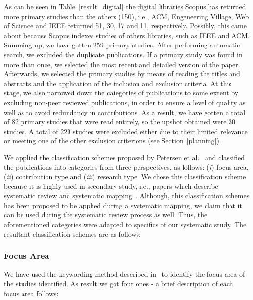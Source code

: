As can be seen in Table~\ref{result_digital} the digital libraries Scopus has returned more primary studies than the others (150), i.e., ACM, Engeneering Village, Web of Science and IEEE returned 51, 30, 17 and 11, respectively. Possibly, this came about because Scopus indexes studies of others libraries, such as IEEE and ACM. Summing up, we have gotten 259 primary studies. After performing automatic search, we excluded the duplicate publications. If a primary study was found in more than once, we selected the most recent and detailed version of the paper. Afterwards, we selected the primary studies by means of reading the titles and abstracts and the application of the inclusion and exclusion criteria. At this stage, we also narrowed down the categories of publications to some extent by excluding non-peer reviewed publications, in order to ensure a level of quality as well as to avoid redundancy in contributions. As a result, we have gotten a total of 82 primary studies that were read entirely, so the upshot obtained were 30 studies. A total of 229 studies were excluded either due to their limited relevance or meeting one of the other exclusion criterions (see Section~\ref{planning}).

We applied the classification schemes proposed by Petersen et al.~\cite{Petersen:2008:SMS:2227115.2227123} and classified the publications into categories from three perspectives, as follows: (\textit{i}) focus area, (\textit{ii}) contribution type and (\textit{iii}) research type. We chose this classification scheme because it is highly used in secondary study, i.e., papers which describe systematic review and systematic mapping~\cite{Mehmood:2013:AMC:2400747.2401009, Durelli:2013:SRM:2480486.2480567}. Although, this classification schemes has been proposed to be applied during a systematic mapping, we claim that it can be used during the systematic review process as well. Thus, the aforementioned categories were adapted to specifics of our systematic study. The resultant classification schemes are as follows:

\subsubsection{Focus Area}

We have used the keywording method described in~\cite{Petersen:2008:SMS:2227115.2227123} to identify the focus area of the studies identified. As result we got four ones - a brief description of each focus area follows:

